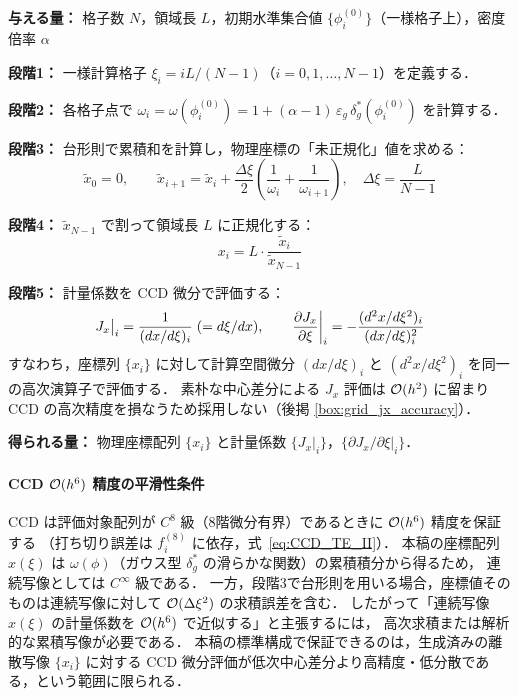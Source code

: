 \begin{tcolorbox}[resultbox, title={1次元格子点座標の構成}]
\textbf{与える量：} 格子数 $N$，領域長 $L$，初期水準集合値 $\{\phi^{(0)}_i\}$（一様格子上），密度倍率 $\alpha$

\textbf{段階1：} 一様計算格子 $\xi_i = iL/(N-1)$（$i=0,1,\ldots,N-1$）を定義する．

\textbf{段階2：} 各格子点で $\omega_i = \omega(\phi^{(0)}_i) = 1 + (\alpha-1)\,\varepsilon_g\,\delta_g^*(\phi^{(0)}_i)$ を計算する．

\textbf{段階3：} 台形則で累積和を計算し，物理座標の「未正規化」値を求める：
\[
  \tilde{x}_0 = 0, \qquad
  \tilde{x}_{i+1} = \tilde{x}_i + \frac{\Delta\xi}{2}\left(\frac{1}{\omega_i} + \frac{1}{\omega_{i+1}}\right),
  \quad \Delta\xi = \frac{L}{N-1}
\]

\textbf{段階4：} $\tilde{x}_{N-1}$ で割って領域長 $L$ に正規化する：
\[
  x_i = L \cdot \frac{\tilde{x}_i}{\tilde{x}_{N-1}}
\]

\textbf{段階5：} 計量係数を CCD 微分で評価する：
\[
  J_x\big|_i = \frac{1}{(dx/d\xi)_i} \;(= d\xi/dx), \qquad
  \dfrac{\partial J_x}{\partial \xi}\bigg|_i = -\frac{(d^2x/d\xi^2)_i}{(dx/d\xi)_i^2}
\]
すなわち，座標列 $\{x_i\}$ に対して計算空間微分
$(dx/d\xi)_i$ と $(d^2x/d\xi^2)_i$ を同一の高次演算子で評価する．
素朴な中心差分による $J_x$ 評価は $\mathcal{O}(h^2)$ に留まり CCD の高次精度を損なうため採用しない（後掲 \ref{box:grid_jx_accuracy}）．

\textbf{得られる量：} 物理座標配列 $\{x_i\}$ と計量係数 $\{J_x|_i\}$，$\{\partial J_x/\partial\xi|_i\}$．
\end{tcolorbox}

\paragraph{\texorpdfstring{CCD $\mathcal{O}(h^6)$ 精度の平滑性条件}{CCD O(h^6) 精度の平滑性条件}}
CCD は評価対象配列が $C^8$ 級（8階微分有界）であるときに $\mathcal{O}(h^6)$ 精度を保証する
（打ち切り誤差は $f^{(8)}_i$ に依存，式~\eqref{eq:CCD_TE_II}）．
本稿の座標配列 $x(\xi)$ は $\omega(\phi)$（ガウス型 $\delta_g^*$ の滑らかな関数）の累積積分から得るため，
連続写像としては $C^\infty$ 級である．
一方，段階3で台形則を用いる場合，座標値そのものは連続写像に対して
$\mathcal{O}(\Delta\xi^2)$ の求積誤差を含む．
したがって「連続写像 $x(\xi)$ の計量係数を $\mathcal{O}(h^6)$ で近似する」と主張するには，
高次求積または解析的な累積写像が必要である．
本稿の標準構成で保証できるのは，生成済みの離散写像 $\{x_i\}$ に対する
CCD 微分評価が低次中心差分より高精度・低分散である，という範囲に限られる．

